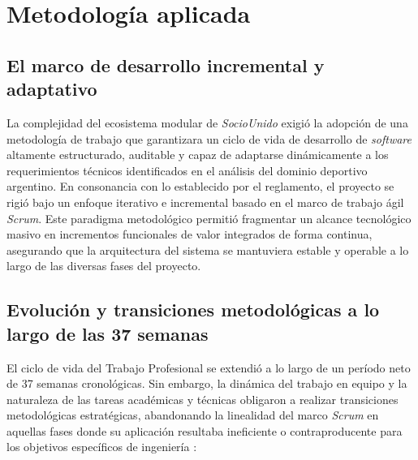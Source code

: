 \section{Metodología aplicada}

\subsection{El marco de desarrollo incremental y adaptativo}

La complejidad del ecosistema modular de \textit{SocioUnido} exigió la adopción de una metodología de trabajo que garantizara un ciclo de vida de desarrollo de \textit{software} altamente estructurado, auditable y capaz de adaptarse dinámicamente a los requerimientos técnicos identificados en el análisis del dominio deportivo argentino. En consonancia con lo establecido por el reglamento, el proyecto se rigió bajo un enfoque iterativo e incremental basado en el marco de trabajo ágil \textit{Scrum}. Este paradigma metodológico permitió fragmentar un alcance tecnológico masivo en incrementos funcionales de valor integrados de forma continua, asegurando que la arquitectura del sistema se mantuviera estable y operable a lo largo de las diversas fases del proyecto.

\subsection{Evolución y transiciones metodológicas a lo largo de las 37 semanas}

El ciclo de vida del Trabajo Profesional se extendió a lo largo de un período neto de 37 semanas cronológicas. Sin embargo, la dinámica del trabajo en equipo y la naturaleza de las tareas académicas y técnicas obligaron a realizar transiciones metodológicas estratégicas, abandonando la linealidad del marco \textit{Scrum} en aquellas fases donde su aplicación resultaba ineficiente o contraproducente para los objetivos específicos de ingeniería :

